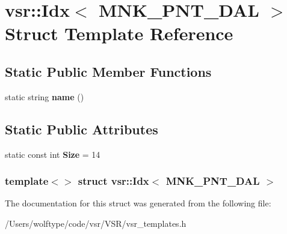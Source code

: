 \hypertarget{structvsr_1_1_idx_3_01_m_n_k___p_n_t___d_a_l_01_4}{\section{vsr\-:\-:Idx$<$ M\-N\-K\-\_\-\-P\-N\-T\-\_\-\-D\-A\-L $>$ Struct Template Reference}
\label{structvsr_1_1_idx_3_01_m_n_k___p_n_t___d_a_l_01_4}
}
\subsection*{Static Public Member Functions}
\begin{DoxyCompactItemize}
\item 
\hypertarget{structvsr_1_1_idx_3_01_m_n_k___p_n_t___d_a_l_01_4_a629a11b4341d346b9d8130a4f2f708b8}{static string {\bfseries name} ()}\label{structvsr_1_1_idx_3_01_m_n_k___p_n_t___d_a_l_01_4_a629a11b4341d346b9d8130a4f2f708b8}

\end{DoxyCompactItemize}
\subsection*{Static Public Attributes}
\begin{DoxyCompactItemize}
\item 
\hypertarget{structvsr_1_1_idx_3_01_m_n_k___p_n_t___d_a_l_01_4_a37011e9dc9fc7b903d4243c526377dba}{static const int {\bfseries Size} = 14}\label{structvsr_1_1_idx_3_01_m_n_k___p_n_t___d_a_l_01_4_a37011e9dc9fc7b903d4243c526377dba}

\end{DoxyCompactItemize}
\subsubsection*{template$<$$>$ struct vsr\-::\-Idx$<$ M\-N\-K\-\_\-\-P\-N\-T\-\_\-\-D\-A\-L $>$}



The documentation for this struct was generated from the following file\-:\begin{DoxyCompactItemize}
\item 
/\-Users/wolftype/code/vsr/\-V\-S\-R/vsr\-\_\-templates.\-h\end{DoxyCompactItemize}
